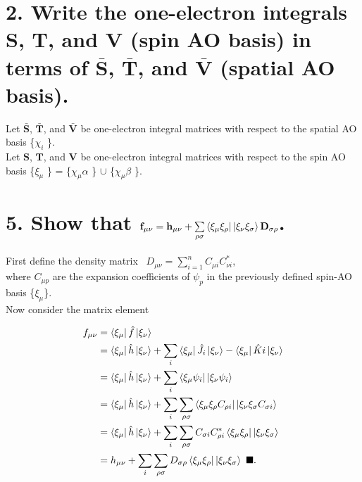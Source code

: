 \documentclass{article}
\newcommand{\vsp}{\vspace{0.2cm}}
\newcommand{\suml}{\sum\limits}
\newcommand{\rh}{\ensuremath{\rho}}                %
\newcommand{\sg}{\ensuremath{\sigma}}           %
\begin{document}
\newpage

\section*{2. Write the one-electron integrals $\mathbf{S}$, $\mathbf{T}$, and $\mathbf{V}$ (spin AO basis) in terms of $\mathbf{\bar{S}}$,  $\mathbf{\bar{T}}$, and $\mathbf{\bar{V}}$ (spatial AO basis).}
Let $\mathbf{\bar{S}}$, $\mathbf{\bar{T}}$, and $\mathbf{\bar{V}}$ be one-electron integral matrices with respect to the spatial AO basis \{$\chi_i$ \}. \\
Let $\mathbf{S}$, $\mathbf{T}$, and $\mathbf{V}$ be one-electron integral matrices with respect to the spin AO basis \{$\xi_\mu$ \} = \{$\chi_\mu \alpha$ \} $\cup$ \{$\chi_\mu \beta$ \}. \\

\newpage

\section*{5. Show that $\mathbf{f_{\mu \nu} = h_{\mu \nu} + \suml_{\rho \sigma} \bra{\xi_\mu \xi_\rho} \ket{\xi_\nu \xi_\sigma} D_{\sigma \rho}}$.}
First define the density matrix \, $D_{\mu \nu} = \suml_{i=1}^n C_{\mu i} C^*_{\nu i}$, \\
where $C_{\mu p}$ are the expansion coefficients of $\psi_p$ in the previously defined spin-AO basis \{$ \xi_\mu$\}. \vsp \\
Now consider the matrix element

\begin{align*}
f_{\mu \nu} &= \bra{\xi_{\mu}} \hat{f} \ket{\xi_{\nu}} \\
		  &=  \bra{\xi_{\mu}} \hat{h} \ket{\xi_{\nu}} + \suml_{i}  \bra{\xi_{\mu}} \hat{J}_i \ket{\xi_{\nu}} -  \bra{\xi_{\mu}} \hat{K}i \ket{\xi_{\nu}} \\
		  &=  \bra{\xi_{\mu}} \hat{h} \ket{\xi_{\nu}} + \suml_{i}  \bra{\xi_{\mu} \psi_i}\ket{\xi_{\nu} \psi_i} \\
		  &=  \bra{\xi_{\mu}} \hat{h} \ket{\xi_{\nu}} + \suml_{i} \suml_{\rh \sg} \bra{\xi_{\mu} \xi_{\rh} C_{\rh i}}\ket{\xi_{\nu} \xi_{\sg} C_{\sg i}} \\
		  &=  \bra{\xi_{\mu}} \hat{h} \ket{\xi_{\nu}} + \suml_{i} \suml_{\rh \sg}  C_{\sg i} C_{\rh i}^* \bra{\xi_{\mu} \xi_{\rh} }\ket{\xi_{\nu} \xi_{\sg} } \\
		   &=  h_{\mu \nu} + \suml_{i} \suml_{\rh \sg}  D_{\sg \rh}  \bra{\xi_{\mu} \xi_{\rh} }\ket{\xi_{\nu} \xi_{\sg} } \, \, \blacksquare. \\
\end{align*}
\end{document}
